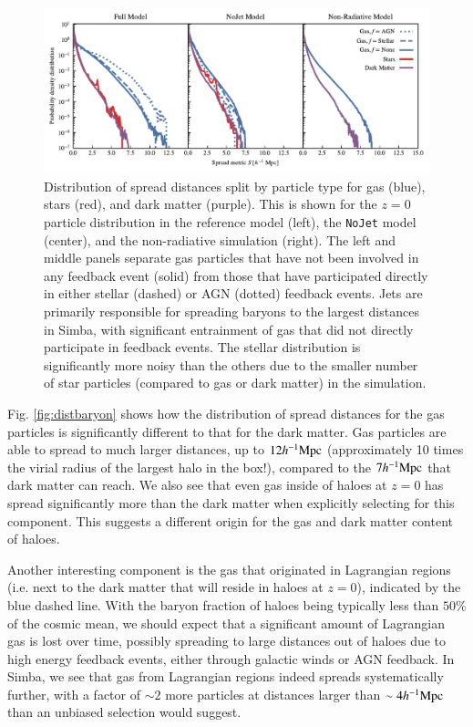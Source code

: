 \documentclass[fleqn,usenatbib]{mnras}
\newcommand{\hmpc}{h^{-1}{\rm Mpc}}
\newcommand{\simba}{{\sc Simba}}
\newcommand{\nojet}{{\tt NoJet}}
\begin{document}
\begin{figure}
    \centering
    \includegraphics[width=\textwidth]{figures/neighbour_analysis_feedback_histogram_combined.pdf}
    \vspace{-0.7cm}
    \caption{Distribution of spread distances split by particle type for gas
    (blue), stars (red), and dark matter (purple). This is shown for the
    $z=0$ particle distribution in the reference model (left), the \nojet{}
    model (center), and the non-radiative simulation (right). The left and
    middle panels separate gas particles that have not been involved in any
    feedback event (solid) from those that have participated directly in
    either stellar (dashed) or AGN (dotted) feedback events. Jets are
    primarily responsible for spreading baryons to the largest distances in
    \simba{}, with significant entrainment of gas that did not directly
    participate in feedback events. The stellar distribution is significantly
    more noisy than the others due to the smaller number of star particles
    (compared to gas or dark matter) in the simulation.
    }\label{fig:feedbackdistance}
\end{figure}


Fig. \ref{fig:distbaryon} shows how the distribution of spread distances
for the gas particles is significantly different to that for the dark matter.
Gas particles are able to spread to much larger distances, up to $12\hmpc{}$
(approximately 10 times the virial radius of the largest halo in the box!),
compared to the $7\hmpc{}$ that dark matter can reach. We also see that even
gas inside of haloes at $z=0$ has spread significantly more than the dark
matter when explicitly selecting for this component. This suggests a
different origin for the gas and dark matter content of haloes.

Another interesting component is the gas that originated in Lagrangian
regions (i.e. next to the dark matter that will reside in haloes at $z=0$),
indicated by the blue dashed line. With the baryon fraction of haloes being
typically less than $50\%$ of the cosmic mean, we should expect that a
significant amount of Lagrangian gas is lost over time, possibly spreading to
large distances out of haloes due to high energy feedback events, either
through galactic winds or AGN feedback. In \simba{}, we see that gas from
Lagrangian regions indeed spreads systematically further, with a factor of
$\sim 2$ more particles at distances larger than $\sim 4 \hmpc{}$ than an
unbiased selection would suggest.
\end{document}
